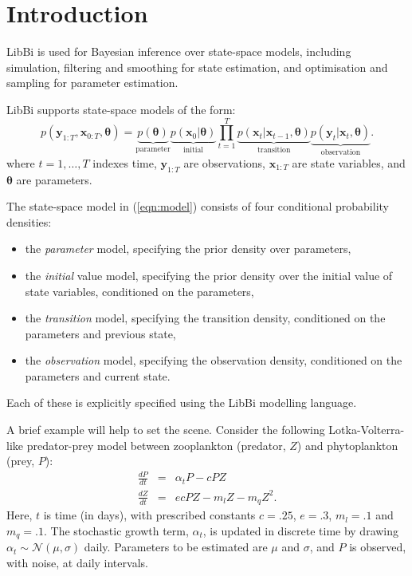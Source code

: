 \section{Introduction\label{Introduction}}

LibBi is used for Bayesian inference over state-space models, including
simulation, filtering and smoothing for state estimation, and optimisation and
sampling for parameter estimation.

LibBi supports state-space models of the form:
\begin{equation}\label{eqn:model}
p(\mathbf{y}_{1:T},\mathbf{x}_{0:T},\boldsymbol{\theta}) =
\underbrace{p(\boldsymbol{\theta})}_{\text{parameter}}
\underbrace{p(\mathbf{x}_0|\boldsymbol{\theta})}_{\text{initial}}
\prod_{t=1}^T
\underbrace{p(\mathbf{x}_t|\mathbf{x}_{t-1},\boldsymbol{\theta})}_{\text{transition}}
\underbrace{p(\mathbf{y}_t|\mathbf{x}_t,\boldsymbol{\theta})}_{\text{observation}}.
\end{equation}
where $t = 1,\ldots,T$ indexes time, $\mathbf{y}_{1:T}$ are observations,
$\mathbf{x}_{1:T}$ are state variables, and $\boldsymbol{\theta}$ are
parameters.

The state-space model in (\ref{eqn:model}) consists of four conditional
probability densities:
\begin{itemize}
\item the \emph{parameter} model, specifying the prior density over parameters,
\item the \emph{initial} value model, specifying the prior density over the
  initial value of state variables, conditioned on the parameters,
\item the \emph{transition} model, specifying the transition density,
  conditioned on the parameters and previous state,
\item the \emph{observation} model, specifying the observation density,
  conditioned on the parameters and current state.
\end{itemize}
Each of these is explicitly specified using the LibBi modelling
language.

A brief example will help to set the scene. Consider the following
Lotka-Volterra-like predator-prey
model between zooplankton (predator, $Z$) and phytoplankton (prey, $P$):
\begin{eqnarray*}
\frac{dP}{dt} &=& \alpha_t P - cPZ\\
\frac{dZ}{dt} &=& ecPZ - m_lZ - m_q Z^2.
\end{eqnarray*}
Here, $t$ is time (in days), with prescribed constants $c = .25$, $e = .3$,
$m_l = .1$ and $m_q = .1$. The stochastic growth term, $\alpha_t$, is updated
in discrete time by drawing $\alpha_t \sim \mathcal{N}(\mu,\sigma)$
daily. Parameters to be estimated are $\mu$ and $\sigma$, and $P$ is observed,
with noise, at daily intervals.

